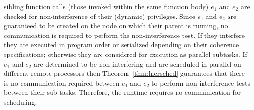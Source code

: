 sibling function calls (those invoked within the same
function body) $e_1$ and $e_2$ are checked for non-interference of their (dynamic)
privileges.  Since $e_1$ and $e_2$ are guaranteed to be created on the node on which their parent
is running, no communication is required to perform the non-interference
test.  If they interfere they are executed in program order or serialized
depending on their coherence specifications; otherwise they are
considered for execution as parallel subtasks.    If $e_1$ and $e_2$ are 
determined to be non-interfering and are scheduled in parallel on different 
remote processors then Theorem~\ref{thm:hiersched}
guarantees that there is no communication required between $e_1$ and $e_2$
to perform non-interference tests between their sub-tasks.  Therefore,
the runtime requires no communication for scheduling.

%
%
% 


